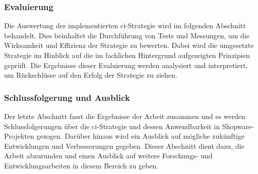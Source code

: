\subsubsection{Evaluierung}

Die Auswertung der implementierten \acrshort{ci}-Strategie wird im folgenden Abschnitt behandelt.
Dies beinhaltet die Durchführung von Tests und Messungen, um die Wirksamkeit und Effizienz der Strategie zu
bewerten.
Dabei wird die umgesetzte Strategie im Hinblick auf die im fachlichen Hintergrund aufgezeigten Prinzipien
geprüft.
Die Ergebnisse dieser Evaluierung werden analysiert und interpretiert, um Rückschlüsse auf den Erfolg der
Strategie zu ziehen.

\subsubsection{Schlussfolgerung und Ausblick}

Der letzte Abschnitt fasst die Ergebnisse der Arbeit zusammen und es werden Schlussfolgerungen über die
\acrshort{ci}-Strategie und dessen Anwendbarkeit in Shopware-Projekten gezogen.
Darüber hinaus wird ein Ausblick auf mögliche zukünftige Entwicklungen und Verbesserungen gegeben.
Dieser Abschnitt dient dazu, die Arbeit abzurunden und einen Ausblick auf weitere Forschungs- und
Entwicklungsarbeiten in diesem Bereich zu geben.

\clearpage

